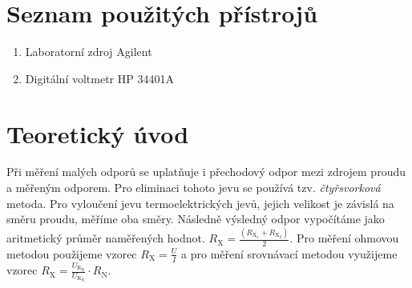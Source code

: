 \documentclass[a4paper,12pt]{article}   %
\newcommand{\tsub}[1]{$_\textrm{#1}$}
\newcommand{\sub}[1]{_{\text{#1}}}
\newcommand{\rxi}{R\sub{X\tsub{1}}}
\newcommand{\rxii}{R\sub{X\tsub{2}}}
\newcommand{\rx}{R\sub{X}}
\newcommand{\rn}{R\sub{N}}
\newcommand{\urx}{U\sub{R\tsub{X}}}
\newcommand{\urn}{U\sub{R\tsub{N}}}
\begin{document}
\section{Seznam použitých přístrojů}
\label{chap:seznam_pristroju}
\begin{enumerate}
  \item Laboratorní zdroj Agilent
  \item Digitální voltmetr HP 34401A
\end{enumerate}




\section{Teoretický úvod}
\label{chap:teoreticky_uvod}
Při měření malých odporů se uplatňuje i přechodový odpor mezi zdrojem proudu a měřeným odporem. Pro eliminaci tohoto jevu se používá tzv. \textit{čtyřsvorková} metoda. Pro vyloučení jevu termoelektrických jevů, jejich velikost je závislá na směru proudu, měříme oba směry. Následně výsledný odpor vypočítáme jako aritmetický průměr naměřených hodnot. $\rx=\frac{\left(\rxi+\rxii\right)}{2}$. Pro měření ohmovou metodou použijeme vzorec $\rx=\frac{U}{I}$ a pro měření srovnávací metodou využijeme vzorec $\rx = \frac{\urx}{\urn}\cdot\rn$.
\end{document}
